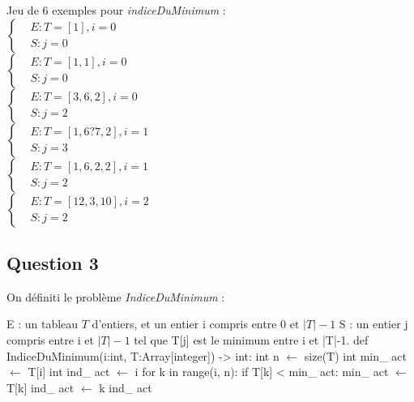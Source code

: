\documentclass{article}
\begin{document}
Jeu de 6 exemples pour \textit{indiceDuMinimum} :
\\
$
\begin{cases}
    & E : T = [1], i = 0
    \\
    & S : j = 0   
\end{cases}
$
\\
$
\begin{cases}
    & E : T = [1,1], i = 0
    \\
    & S : j = 0   
\end{cases}
$
\\
$
\begin{cases}
    & E : T = [3, 6, 2], i = 0
    \\
    & S : j = 2
\end{cases}
$
\\
$
\begin{cases}
    & E : T = [1, 6? 7, 2], i = 1
    \\
    & S : j = 3
\end{cases}
$
\\
$
\begin{cases}
    & E : T = [1, 6, 2, 2], i = 1
    \\
    & S : j = 2   
\end{cases}
$
\\
$
\begin{cases}
    & E : T = [12, 3, 10], i = 2
    \\
    & S : j = 2
\end{cases}
$

\subsection*{Question 3}

On définiti le problème \textit{IndiceDuMinimum} :

\begin{algorithm}[H]
    \caption{\textit{IndiceDuMinimum}}
    \begin{algorithmic}[1]
        \State E : un tableau $T$ d'entiers, et un entier i compris entre 0 et $ |T|-1$
        \State S : un entier j compris entre i et $ |T|-1$ tel que T[j] est le minimum entre i et |T|-1.
        \State def IndiceDuMinimum(i:int, T:Array[integer]) -> int:
        \State \qquad int n $\leftarrow$ size(T)
        \State \qquad int min\_ act $\leftarrow$ T[i]
        \State \qquad int ind\_ act $\leftarrow$ i 
        \State \qquad for k in range(i, n):
            \State \qquad \qquad if T[k] < min\_ act:
                \State \qquad \qquad \qquad min\_ act $\leftarrow$ T[k]
                \State \qquad \qquad \qquad ind\_ act $\leftarrow$ k 
        \State \Return ind\_ act 
    \end{algorithmic}
\end{algorithm}
\end{document}
